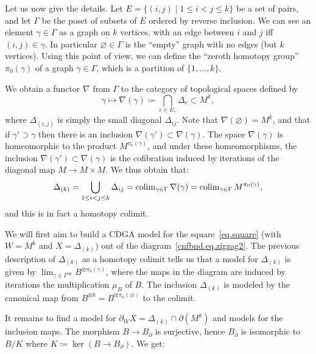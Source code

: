 Let us now give the details.
Let $E = \{ (i,j) \mid 1 \leq i < j \leq k \}$ be a set of pairs, and let $\Gamma$ be the poset of subsets of $E$ ordered by reverse inclusion.
We can see an element $\gamma \in \Gamma$ as a graph on $k$ vertices, with an edge between $i$ and $j$ iff $(i,j) \in \gamma$.
In particular $\varnothing \in \Gamma$ is the ``empty'' graph with no edges (but $k$ vertices).
Using this point of view, we can define the ``zeroth homotopy group'' $\pi_{0}(\gamma)$ of a graph $\gamma \in \Gamma$, which is a partition of $\{1, \dots, k\}$.

We obtain a functor $\nabla$\index{$\nabla(\gamma)$} from $\Gamma$ to the category of topological spaces defined by
\begin{equation}
  \gamma \mapsto \nabla(\gamma) \coloneqq \bigcap_{e \in E_{\gamma}} \Delta_{e} \subset M^{k},
\end{equation}
where $\Delta_{(i,j)}$ is simply the small diagonal $\Delta_{ij}$.
Note that $\nabla(\varnothing) = M^{k}$, and that if $\gamma' \supset \gamma$ then there is an inclusion $\nabla(\gamma') \subset \nabla(\gamma)$.
The space $\nabla(\gamma)$ is homeomorphic to the product $M^{\pi_{0}(\gamma)}$, and under these homeomorphisms, the inclusion $\nabla(\gamma') \subset \nabla(\gamma)$ is the cofibration induced by iterations of the diagonal map $M \to M \times M$.
We thus obtain that:
\begin{equation}
  \label{cnfbnd.eq.delta-colim}
  \Delta_{(k)} = \bigcup_{1 \leq i < j \leq k} \Delta_{ij} = \operatorname{colim}_{\gamma \in \Gamma} \nabla(\gamma) = \operatorname{colim}_{\gamma \in \Gamma} M^{\pi_{0}(\gamma)},
\end{equation}
and this is in fact a homotopy colimit.

We will first aim to build a CDGA model for the square~\eqref{eq.square} (with $W = M^{k}$ and $X = \Delta_{(k)}$) out of the diagram~\eqref{cnfbnd.eq.zigzag2}.
The previous description of $\Delta_{(k)}$ as a homotopy colimit tells us that a model for $\Delta_{(k)}$ is given by $\lim_{\gamma \in \Gamma^{\mathrm{op}}} B^{\otimes \pi_{0}(\gamma)}$, where the maps in the diagram are induced by iterations the multiplication $\mu_{B}$ of $B$.
The inclusion $\Delta_{(k)}$ is modeled by the canonical map from $B^{\otimes k} = B^{\otimes \pi_{0}(\varnothing)}$ to the colimit.

It remains to find a model for $\partial_{W} X = \Delta_{(k)} \cap \partial(M^{k})$ and models for the inclusion maps.
The morphism $B \to B_{\partial}$ is surjective, hence $B_{\partial}$ is isomorphic to $B / K$ where $K \coloneqq \ker (B \to B_{\partial})$.
We get:

